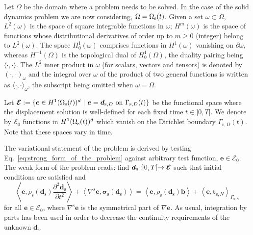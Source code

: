 \documentclass[11pt,english]{article}
\begin{document}
Let $\Omega$ be the domain where a problem needs to be solved. In the case of the solid dynamics problem we are now considering, $\Omega = \Omega_{\rm s}(t)$. Given a set $\omega\subset \Omega$, $L^{2}(\omega)$ is the space of square integrable functions in $\omega$;  $H^{m}(\omega)$ is the space of functions whose distributional derivatives of order up to $m\geq0$ (integer) belong to $L^{2}(\omega)$. The space $H_{0}^{1}(\omega)$ comprises functions in $H^{1}(\omega)$ vanishing on $\partial\omega$, whereas $H^{-1}(\Omega)$ is the topological dual of $H_{0}^{1}(\Omega)$, the duality pairing being $\langle\cdot,\cdot\rangle$. The $L^{2}$ inner product in $\omega$ (for scalars, vectors and tensors) is denoted by $(\cdot,\cdot)_{\omega}$ and the integral over $\omega$ of the product of two general functions is written as $\langle\cdot,\cdot\rangle_{\omega}$, the subscript being omitted when $\omega=\Omega$.  

Let $\boldsymbol{\mathcal{E}} : = \{ \boldsymbol{e}  \in H^1(\Omega_{\rm s}(t))^d~\vert~ \boldsymbol{e} = \boldsymbol{d}_{\mathrm{s},D} ~\hbox{on}~\Gamma_{\mathrm{s},D}(t)\}$ be the functional space where the displacement solution is well-defined for each fixed time $t \in ] 0, T[$. We denote by $\boldsymbol{\mathcal{E}}_0$ functions in $H^1(\Omega_{\rm s}(t))^d$ which vanish on the Dirichlet boundary $\Gamma_{\mathrm{s},D}(t)$. Note that these spaces vary in time.

The variational statement of the problem is derived by testing Eq.~\eqref{eq:strong_form_of_the_problem} against arbitrary test function, $\boldsymbol{e} \in \boldsymbol{\mathcal{E}}_0 $. The weak form of the problem reads: find $\boldsymbol{d}_{\rm{s}} : ]0,T[ \rightarrow  \boldsymbol{\mathcal{E}} $ such that initial conditions are satisfied and
\begin{equation}
    \left \langle \boldsymbol{e} , \rho_\mathrm{s}\left(\boldsymbol{d}_{\mathrm{s}}\right) \frac{\partial^2 \boldsymbol{d}_\mathrm{s}}{\partial t^2} \right \rangle + \left \langle \nabla^{\mathrm{s}} \boldsymbol{e} , \boldsymbol{\sigma}_\mathrm{s} \left ( \boldsymbol{d}_\mathrm{s} \right) \right \rangle = \left \langle \boldsymbol{e} , \rho_\mathrm{s}\left(\boldsymbol{d}_{\mathrm{s}}\right) \boldsymbol{b} \right \rangle + \left \langle \boldsymbol{e} , \boldsymbol{t}_{\mathrm{s},N} \right \rangle_{\Gamma_{\mathrm{s},N}}
    \label{eq:variational_form_compact_manner}
\end{equation}
for all $\boldsymbol{e} \in \boldsymbol{\mathcal{E}}_0$, where $\nabla^{\mathrm{s}} \boldsymbol{e}$ is the symmetrical part of $\nabla \boldsymbol{e}$. As usual, integration by parts has been used in order to decrease the continuity requirements of the unknown $\boldsymbol{d}_\mathrm{s}$.
\end{document}
